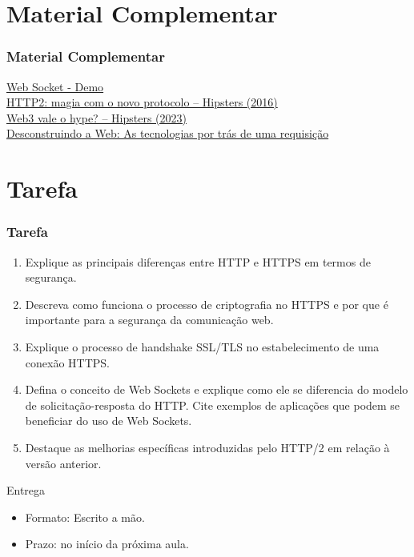 \documentclass[
	10pt, %
	t, %
]{beamer}
\begin{document}
\section{Material Complementar}

\begin{frame}
	\frametitle{Material Complementar}

	\href{https://codepen.io/matt-west/pen/nYvVBV}{\faLink \hspace{0.2em} Web Socket - Demo}\\
	\href{https://www.hipsters.tech/http2-magia-com-o-novo-protocolo}{\faPodcast \hspace{0.2em} HTTP2: magia com o novo protocolo – Hipsters (2016)}\\
	\href{https://www.hipsters.tech/web3-vale-o-hype-hipsters-ponto-tech-380}{\faPodcast \hspace{0.2em} Web3 vale o hype? – Hipsters (2023)}\\
	\href{https://www.casadocodigo.com.br/products/livro-desconstruindo-web}{\faBook \hspace{0.2em} Desconstruindo a Web: As tecnologias por trás de uma requisição}\\

\end{frame}

\section{Tarefa}

\begin{frame}
	\frametitle{Tarefa}

	\begin{enumerate}
		\item Explique as principais diferenças entre HTTP e HTTPS em termos de segurança.
		\item Descreva como funciona o processo de criptografia no HTTPS e por que é importante para a segurança da comunicação web.
		\item Explique o processo de handshake SSL/TLS no estabelecimento de uma conexão HTTPS.
		\item Defina o conceito de Web Sockets e explique como ele se diferencia do modelo de solicitação-resposta do HTTP. Cite exemplos de aplicações que podem se beneficiar do uso de Web Sockets.
		\item Destaque as melhorias específicas introduzidas pelo HTTP/2 em relação à versão anterior.
	\end{enumerate}

	\begin{alertblock}{Entrega}
		\begin{itemize}
			\item Formato: Escrito a mão.
			\item Prazo: no início da próxima aula.
		\end{itemize}
	\end{alertblock}

\end{frame}
\end{document}
